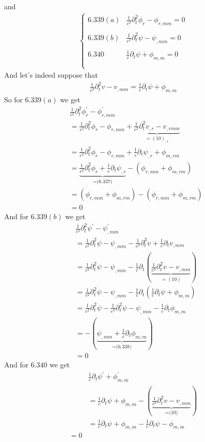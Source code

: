 and 
\begin{align}
\left\{\begin{array}{ll}
\mathbf{6.339}(a)&\frac{1}{c^2}\partial^2_t \phi_r- \phi_{r,mm}=0\\\\
\mathbf{6.339}(b)&\frac{1}{c^2}\partial^2_t \psi- \psi_{,mm}=0\\\\
\mathbf{6.340}&\frac{1}{c}\partial_t \psi+ \phi_{m,m}=0\\\\
\end{array}\right.
\end{align}
And let's indeed suppose that 
\begin{align}
\frac{1}{c^2}\partial^2_t v - v_{,mm}= \frac{1}{c}\partial_t\psi + \phi_{m,m}
\end{align}
So for $\mathbf{6.339}(a)$ we get 
\begin{align}
&\frac{1}{c^2}\partial^2_t \phi^{'}_r- \phi^{'}_{r,mm}\\
&= \frac{1}{c^2}\partial^2_t \phi^{}_r- \phi^{}_{r,mm}+\underbrace{\frac{1}{c^2}\partial^2_t v_{,r}- v_{,rmm}}_{= (10)_{,r}}\\
&= \frac{1}{c^2}\partial^2_t \phi^{}_r- \phi^{}_{r,mm}+\frac{1}{c}\partial_t\psi_{,r} + \phi_{m,rm}\\
&= \underbrace{\frac{1}{c^2}\partial^2_t \phi^{}_r+\frac{1}{c}\partial_t\psi_{,r}}_{=\text{(6.337)}} - \left(\phi^{}_{r,mm}+ \phi_{m,rm}\right)\\
&= \left(\phi^{}_{r,mm}+ \phi_{m,rm}\right) - \left(\phi^{}_{r,mm}+ \phi_{m,rm}\right)\\
&=0
\end{align}
And for $\mathbf{6.339}(b)$ we get 
\begin{align}
&\frac{1}{c^2}\partial^2_t \psi^{'}- \psi^{'}_{,mm}\\
&= \frac{1}{c^2}\partial^2_t \psi- \psi^{}_{,mm}-\frac{1}{c^3}\partial^3_t v_{}+ \frac{1}{c}\partial_t v_{,mm}\\
&= \frac{1}{c^2}\partial^2_t \psi- \psi^{}_{,mm}-\frac{1}{c}\partial_t\left(\underbrace{\frac{1}{c^2}\partial^2_t v_{}- v_{,mm}}_{= (10)}\right)\\
&= \frac{1}{c^2}\partial^2_t \psi- \psi^{}_{,mm}-\frac{1}{c}\partial_t\left(\frac{1}{c}\partial_t\psi + \phi_{m,m}\right)\\
&= \frac{1}{c^2}\partial^2_t \psi-\frac{1}{c^2}\partial^{2}_t\psi- \psi^{}_{,mm}-\frac{1}{c}\partial_t\phi_{m,m}\\
&= - \left(\underbrace{\psi^{}_{,mm}+\frac{1}{c}\partial_t\phi_{m,m}}_{= \text{(6.338)}}\right)\\
&=0
\end{align}
And for $\mathbf{6.340}$ we get 
\begin{align}
&\frac{1}{c}\partial_t \psi^{'}+ \phi^{'}_{m,m}\\
&= \frac{1}{c}\partial_t \psi^{}+ \phi^{}_{m,m}-\left(\underbrace{\frac{1}{c^2}\partial^2_t v-v_{,mm}}_{=\text{(10)}}\right)\\
&= \frac{1}{c}\partial_t \psi^{}+ \phi^{}_{m,m}-\frac{1}{c}\partial_t \psi^{}- \phi^{}_{m,m}\\
=0
\end{align}

